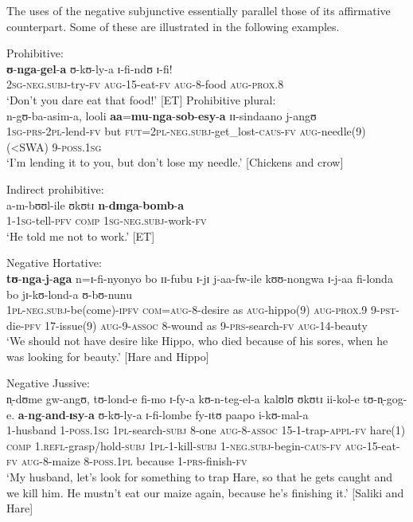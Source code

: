 The uses of the negative subjunctive essentially parallel those of its affirmative counterpart. Some of these are illustrated in the following examples.
\begin{exe}
\ex Prohibitive:\\
\gll \textbf{ʊ}-\textbf{nga}-\textbf{gel}-\textbf{a} ʊ-kʊ-ly-a ɪ-fi-ndʊ ɪ-fi!\\
\textsc{2sg}-\textsc{neg.subj}-try-\textsc{fv} \textsc{aug}-15-eat-\textsc{fv} \textsc{aug}-8-food \textsc{aug}-\textsc{prox.8}\\
\glt \lq Don't you dare eat that food!' [ET]
\ex Prohibitive plural:\\
\gll n-gʊ-ba-asim-a, looli \textbf{aa}=\textbf{mu}-\textbf{nga}-\textbf{sob}-\textbf{esy}-\textbf{a} ɪɪ-sindaano j-angʊ\\
\textsc{1sg}-\textsc{prs}-\textsc{2pl}-lend-\textsc{fv} but \textsc{fut}=\textsc{2pl}-\textsc{neg.subj}-get\_lost-\textsc{caus}-\textsc{fv} \textsc{aug}-needle(9)(<SWA) 9-\textsc{poss.1sg}\\
\glt \lq I'm lending it to you, but don't lose my needle.' [Chickens and crow]

\ex Indirect prohibitive:\\
\gll a-m-bʊʊl-ile ʊkʊtɪ \textbf{n}-\textbf{dɪnga}-\textbf{bomb}-\textbf{a}\\
1-\textsc{1sg}-tell-\textsc{pfv} \textsc{comp} \textsc{1sg}-\textsc{neg.subj}-work-\textsc{fv}\\
\glt \lq He told me not to work.' [ET]

\ex Negative Hortative:
\label{exNegativeHortative}\\
\gll \textbf{tʊ}-\textbf{nga}-\textbf{j}-\textbf{aga} n=ɪ-fi-nyonyo bo ɪɪ-fubu ɪ-jɪ j-aa-fw-ile kʊʊ-nongwa ɪ-j-aa fi-londa bo jɪ-kʊ-lond-a ʊ-bʊ-nunu\\
\textsc{1pl}-\textsc{neg.subj}-be(come)-\textsc{ipfv} \textsc{com}=\textsc{aug}-8-desire as \textsc{aug}-hippo(9) \textsc{aug}-\textsc{prox.9} 9-\textsc{pst}-die-\textsc{pfv} 17-issue(9) \textsc{aug}-9-\textsc{assoc} 8-wound as 9-\textsc{prs}-search-\textsc{fv} \textsc{aug}-14-beauty\\
\glt `We should not have desire like Hippo, who died because of his sores, when he was looking for beauty.' [Hare and Hippo]

\ex Negative Jussive: \label{exNegativeJussive}\\
\gll n̩-dʊme gw-angʊ, tʊ-lond-e fi-mo ɪ-fy-a kʊ-n-teg-el-a kalʊlʊ ʊkʊtɪ ii-kol-e tʊ-n̩-gog-e. \textbf{a}-\textbf{ng}-\textbf{and}-\textbf{ɪsy}-\textbf{a} ʊ-kʊ-ly-a ɪ-fi-lombe fy-ɪtʊ paapo i-kʊ-mal-a\\
1-husband 1-\textsc{poss.1sg} \textsc{1pl}-search-\textsc{subj} 8-one \textsc{aug}-8-\textsc{assoc} 15-1-trap-\textsc{appl}-\textsc{fv} hare(1) \textsc{comp} 1.\textsc{refl}-grasp/hold-\textsc{subj} \textsc{1pl}-1-kill-\textsc{subj} 1-\textsc{neg.subj}-begin-\textsc{caus}-\textsc{fv} \textsc{aug}-15-eat-\textsc{fv} \textsc{aug}-8-maize 8-\textsc{poss.1pl} because 1-\textsc{prs}-finish-\textsc{fv}\\
\glt `My husband, let's look for something to trap Hare, so that he gets caught and we kill him. He mustn't eat our maize again, because he's finishing it.' [Saliki and Hare]


\end{exe}
